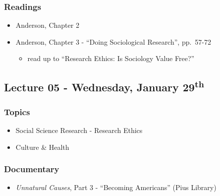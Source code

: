 \documentclass[]{book}
\providecommand{\tightlist}{%
  \setlength{\itemsep}{0pt}\setlength{\parskip}{0pt}}
\begin{document}
\hypertarget{readings-4}{%
\subsubsection*{Readings}\label{readings-4}}

\begin{itemize}
\tightlist
\item
  Anderson, Chapter 2
\item
  Anderson, Chapter 3 - ``Doing Sociological Research'', pp.~57-72

  \begin{itemize}
  \tightlist
  \item
    read up to ``Research Ethics: Is Sociology Value Free?''
  \end{itemize}
\end{itemize}

\hypertarget{lecture-05---wednesday-january-29th}{%
\subsection*{\texorpdfstring{Lecture 05 - Wednesday, January 29\textsuperscript{th}}{Lecture 05 - Wednesday, January 29th}}\label{lecture-05---wednesday-january-29th}}

\hypertarget{topics-5}{%
\subsubsection*{Topics}\label{topics-5}}

\begin{itemize}
\tightlist
\item
  Social Science Research - Research Ethics
\item
  Culture \& Health
\end{itemize}

\hypertarget{documentary-1}{%
\subsubsection*{Documentary}\label{documentary-1}}

\begin{itemize}
\tightlist
\item
  \emph{Unnatural Causes}, Part 3 - ``Becoming Americans'' (Pius Library)
\end{itemize}
\end{document}

